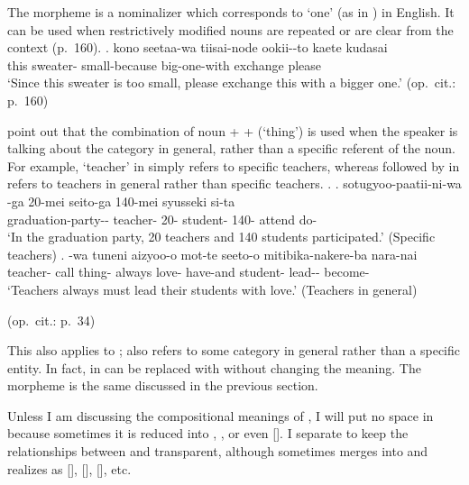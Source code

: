 The morpheme  is a nominalizer which corresponds to `one' (as in ) in English.
It can be used when restrictively modified nouns are repeated or are clear from the context (p.\ 160).
%
\exg. kono seetaa-wa tiisai-node ookii--to kaete kudasai \\
	this sweater- small-because big-one-with exchange please \\
	`Since this sweater is too small, please exchange this with a bigger one.'
	\hfill{(op.\ cit.: p.\ 160)}

 point out that
the combination of noun +  +  (`thing') is used
when the speaker is talking about the category in general,
rather than a specific referent of the noun.
For example,  `teacher' in \Next[a] simply refers to specific teachers,
whereas  followed by  in \Next[b] refers to teachers in general rather than specific teachers.
%
\ex.
 \ag. sotugyoo-paatii-ni-wa -ga 20-mei seito-ga 140-mei syusseki si-ta \\
	graduation-party-- teacher- 20- student- 140- attend do- \\
	`In the graduation party, 20 teachers and 140 students participated.'
	\hfill{(Specific teachers)}
 \bg.   -wa tuneni aizyoo-o mot-te seeto-o mitibika-nakere-ba nara-nai \\
 teacher- call thing- always love- have-and student- lead-- become- \\
 `Teachers always must lead their students with love.'
 \hfill{(Teachers in general)}
 \begin{flushright}
 	(op.\ cit.: p.\ 34)
 \end{flushright}

This also applies to ;
 also refers to some category in general rather than a specific entity.
In fact,  in \Last[b] can be replaced with  without changing the meaning.
The morpheme  is the same  discussed in the previous section.

Unless I am discussing the compositional meanings of ,
I will put no space in 
because sometimes it is reduced into , , or even [].
I separate  to keep the relationships between  and  transparent,
although  sometimes merges into 
and realizes as [], [], [], etc.


